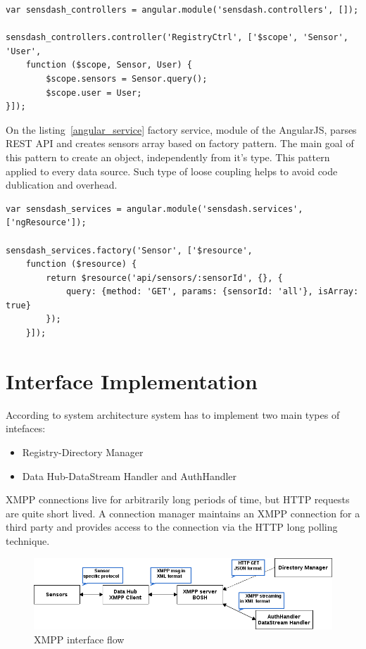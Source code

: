     \begin{lstlisting}[label=angular_controller,caption=Controller controller.js]
var sensdash_controllers = angular.module('sensdash.controllers', []);

sensdash_controllers.controller('RegistryCtrl', ['$scope', 'Sensor', 'User',
    function ($scope, Sensor, User) {
        $scope.sensors = Sensor.query();
        $scope.user = User;
}]);
    \end{lstlisting}
On the listing~\ref{angular_service} factory service, module of the AngularJS, parses REST API and creates sensors array based on factory pattern. The main goal of this pattern to create an object, independently from it's type. This pattern applied to every data source. Such type of loose coupling helps to avoid code dublication and overhead.  
    \begin{lstlisting}[label=angular_service,caption=Controller controller.js]
var sensdash_services = angular.module('sensdash.services', ['ngResource']);

sensdash_services.factory('Sensor', ['$resource',
    function ($resource) {
        return $resource('api/sensors/:sensorId', {}, {
            query: {method: 'GET', params: {sensorId: 'all'}, isArray: true}
        });
    }]);
    \end{lstlisting}


\section{Interface Implementation}
	 According to system architecture system has to implement two main types of intefaces:
	 \begin{itemize}
	 \item Registry-Directory Manager
	 \item Data Hub-DataStream Handler and AuthHandler
	 \end{itemize}
	 XMPP connections live for arbitrarily long periods of time, but HTTP requests are quite short lived.
	A connection manager maintains an XMPP connection for a third party and provides access to the connection via the HTTP long polling technique.
	    \begin{figure}[!ht]
		\centering
		\includegraphics[scale=0.6]{images/XMPPflow.png}   
		\caption[XMPP BOSH/Stream]{XMPP interface flow}                      
		\end{figure}

